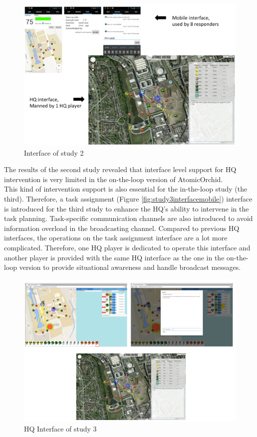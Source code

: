 \begin{figure}[H]
  \centering
  \includegraphics[width=1\textwidth]{img/conclusion/study2interface}
  \caption{Interface of study 2}
  \label{fig:study2interface}
\end{figure}

The results of the second study revealed that interface level support for HQ intervention is very limited in the on-the-loop version of AtomicOrchid. \\

This kind of intervention support is also essential for the in-the-loop study (the third). Therefore, a task assignment (Figure \ref{fig:study3interfacemobile}) interface is introduced for the third study to enhance the HQ's ability to intervene in the task planning. Task-specific communication channels are also introduced to avoid information overload in the broadcasting channel. Compared to previous HQ interfaces, the operations on the task assignment interface are a lot more complicated. Therefore, one HQ player is dedicated to operate this interface and another player is provided with the same HQ interface as the one in the on-the-loop version to provide situational awareness and handle broadcast messages. 

\begin{figure}[H]
  \centering
  \includegraphics[width=1\textwidth]{img/conclusion/study3interfaceHQ}
  \caption{HQ Interface of study 3}
  \label{fig:study3interfacehq}
\end{figure}

